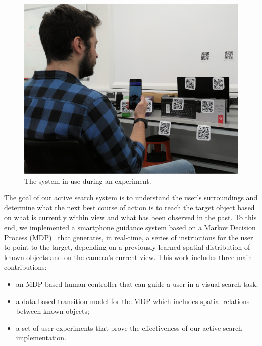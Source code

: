 \documentclass[a4paper, twoside]{article}
\begin{document}
\begin{figure}
  \centering
  \includegraphics[width=0.85\columnwidth]{../figures/system_use.png}
  \caption{The system in use during an experiment. }\label{fig:system-use}
\end{figure}

The goal of our active search system is to understand the user's surroundings and determine what the next best course of action is to reach the target object based on what is currently within view and what has been observed in the past. To this end, we implemented a smartphone guidance system based on a Markov Decision Process (MDP)~\cite{bellman1957markovian} that generates, in real-time, a series of instructions for the user to point to the target, depending on a previously-learned spatial distribution of known objects and on the camera's current view.  
%
This work includes three main contributions:

\begin{itemize}
  \item an MDP-based human controller that can guide a user in a visual search task;
  \item a data-based transition model for the MDP which includes spatial relations between known objects;
  \item a set of user experiments that prove the effectiveness of our active search implementation.
\end{itemize}

\end{document}
